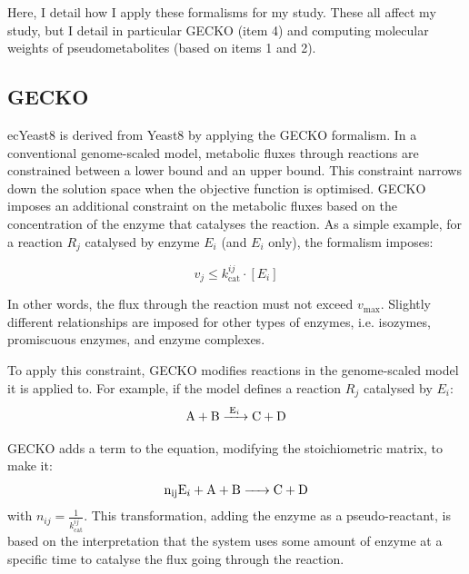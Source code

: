 Here, I detail how I apply these formalisms for my study.
These all affect my study, but I detail in particular GECKO (item 4) and computing molecular weights of pseudometabolites (based on items 1 and 2).

\subsection{GECKO}
\label{subsec:model-yeast8-gecko}

ecYeast8 is derived from Yeast8 by applying the GECKO formalism.
In a conventional genome-scaled model, metabolic fluxes through reactions are constrained between a lower bound and an upper bound.
This constraint narrows down the solution space when the objective function is optimised.
GECKO imposes an additional constraint on the metabolic fluxes based on the concentration of the enzyme that catalyses the reaction.
As a simple example, for a reaction $R_{j}$ catalysed by enzyme $E_{i}$ (and $E_{i}$ only), the formalism imposes:

\begin{equation}
  v_{j} \leq k_{\mathrm{cat}}^{ij} \cdot [E_{i}]
  \label{eq:model-gecko-kcat}
\end{equation}

In other words, the flux through the reaction must not exceed $v_{\mathrm{max}}$.
Slightly different relationships are imposed for other types of enzymes, i.e. isozymes, promiscuous enzymes, and enzyme complexes.

To apply this constraint, GECKO modifies reactions in the genome-scaled model it is applied to.
For example, if the model defines a reaction $R_{j}$ catalysed by $E_{i}$:
\begin{equation}
  \ce{ A + B ->[E_{i}] C + D }
  \label{eq:model-gecko-catalysed}
\end{equation}

GECKO adds a term to the equation, modifying the stoichiometric matrix, to make it:
\begin{equation}
  \ce{ n_{ij}E_{i} + A + B -> C + D }
  \label{eq:model-gecko-catalysed-formalism}
\end{equation}
with $n_{ij} = \frac{1}{k_{\mathrm{cat}}^{ij}}$.
This transformation, adding the enzyme as a pseudo-reactant, is based on the interpretation that the system uses some amount of enzyme at a specific time to catalyse the flux going through the reaction.

